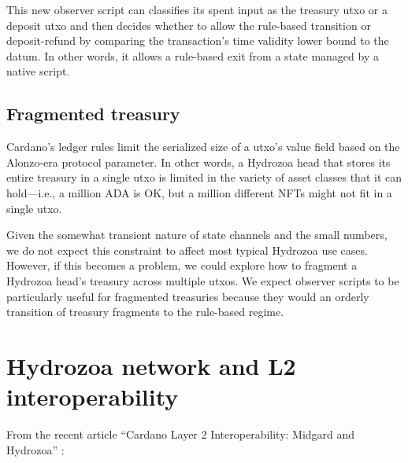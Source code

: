 \documentclass[../hydrozoa.tex]{subfiles}
\begin{document}
This new observer script can classifies its spent input as the treasury utxo or a deposit utxo and then decides whether to allow the rule-based transition or deposit-refund by comparing the transaction's time validity lower bound to the datum.
In other words, it allows a rule-based exit from a state managed by a native script.

\subsection{Fragmented treasury}%
\label{h:observer-script-fragmented-treasury}%

Cardano's ledger rules limit the serialized size of a utxo's value field based on the Alonzo-era  protocol parameter.
In other words, a Hydrozoa head that stores its entire treasury in a single utxo is limited in the variety of asset classes that it can hold---i.e., a million ADA is OK, but a million different NFTs might not fit in a single utxo.

Given the somewhat transient nature of state channels and the small numbers, we do not expect this constraint to affect most typical Hydrozoa use cases.
However, if this becomes a problem, we could explore how to fragment a Hydrozoa head's treasury across multiple utxos.
We expect observer scripts to be particularly useful for fragmented treasuries because they would an orderly transition of treasury fragments to the rule-based regime.

\section{Hydrozoa network and L2 interoperability}%
\label{h:hydrozoa-network-l2-interoperability}%

From the recent article ``Cardano Layer 2 Interoperability:
Midgard and Hydrozoa'' \citep{FlerovskyDisarroCardanoLayer22024}:
\end{document}
